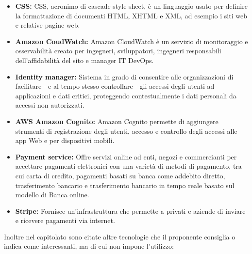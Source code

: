 \begin{itemize}
    \item \textbf{CSS:} CSS, acronimo di cascade style sheet, è un linguaggio usato per definire la formattazione di documenti HTML, XHTML e XML, ad esempio i siti web e relative pagine web.
    \item \textbf{Amazon CoudWatch:} Amazon CloudWatch è un servizio di monitoraggio e osservabilità creato per ingegneri, sviluppatori, ingegneri responsabili dell'affidabilità del sito e manager IT DevOps.
    \item \textbf{Identity manager:} Sistema in grado di consentire alle organizzazioni di facilitare - e al tempo stesso controllare - gli accessi degli utenti ad applicazioni e dati critici, proteggendo contestualmente i dati personali da accessi non autorizzati.
    \item \textbf{AWS Amazon Cognito:} Amazon Cognito permette di aggiungere strumenti di registrazione degli utenti, accesso e controllo degli accessi alle app Web e per dispositivi mobili.
    \item \textbf{Payment service:} Offre servizi online ad enti, negozi e commercianti per accettare pagamenti elettronici con una varietà di metodi di pagamento, tra cui carta di credito, pagamenti basati su banca come addebito diretto, trasferimento bancario e trasferimento bancario in tempo reale basato sul modello di Banca online.
    \item \textbf{Stripe:} Fornisce un’infrastruttura che permette a privati e aziende di inviare e ricevere pagamenti via internet.
\end{itemize}
Inoltre nel capitolato sono citate altre tecnologie che il proponente consiglia o indica come interessanti, ma di cui non impone l'utilizzo:
